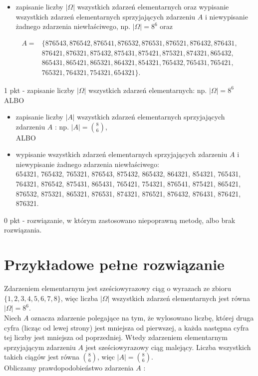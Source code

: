 \documentclass[10pt]{article}
\begin{document}
\begin{itemize}
  \item zapisanie liczby $|\Omega|$ wszystkich zdarzeń elementarnych oraz wypisanie wszystkich zdarzeń elementarnych sprzyjających zdarzeniu $A$ i niewypisanie żadnego zdarzenia niewłaściwego, np. $|\Omega|=8^{6}$ oraz
\end{itemize}

$$
\begin{aligned}
A= & \{876543,876542,876541,876532,876531,876521,876432,876431, \\
& 876421,876321,875432,875431,875421,875321,874321,865432, \\
& 865431,865421,865321,864321,854321,765432,765431,765421, \\
& 765321,764321,754321,654321\} .
\end{aligned}
$$

1 pkt - zapisanie liczby $|\Omega|$ wszystkich zdarzeń elementarnych: np. $|\Omega|=8^{6}$ ALBO

\begin{itemize}
  \item zapisanie liczby $|A|$ wszystkich zdarzeń elementarnych sprzyjających zdarzeniu $A$ : np. $|A|=\binom{8}{6}$,\\
ALBO
  \item wypisanie wszystkich zdarzeń elementarnych sprzyjających zdarzeniu $A$ i niewypisanie żadnego zdarzenia niewłaściwego:\\
654321, 765432, 765321, 876543, 875432, 865432, 864321, 854321, 765431, 764321, 876542, 875431, 865431, 765421, 754321, 876541, 875421, 865421, 876532, 875321, 865321, 876531, 874321, 876521, 876432, 876431, 876421, 876321.
\end{itemize}

0 pkt - rozwiązanie, w którym zastosowano niepoprawną metodę, albo brak rozwiązania.

\section*{Przykładowe pełne rozwiązanie}
Zdarzeniem elementarnym jest sześciowyrazowy ciąg o wyrazach ze zbioru\\
$\{1,2,3,4,5,6,7,8\}$, więc liczba $|\Omega|$ wszystkich zdarzeń elementarnych jest równa $|\Omega|=8^{6}$.\\
Niech $A$ oznacza zdarzenie polegające na tym, że wylosowano liczbę, której druga cyfra (licząc od lewej strony) jest mniejsza od pierwszej, a każda następna cyfra tej liczby jest mniejsza od poprzedniej. Wtedy zdarzeniem elementarnym sprzyjającym zdarzeniu $A$ jest sześciowyrazowy ciąg malejący. Liczba wszystkich takich ciągów jest równa $\binom{8}{6}$, więc $|A|=\binom{8}{6}$.\\
Obliczamy prawdopodobieństwo zdarzenia $A$ :
\end{document}
